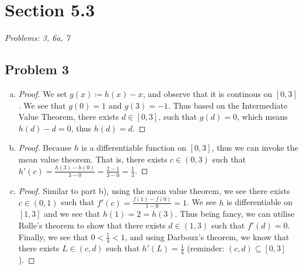 \documentclass[12pt]{article}
\begin{document}

\section*{Section 5.3}
\textit{Problems: 3, 6a, 7}
\subsection*{Problem 3}
\begin{enumerate}[a).]
    \item {
        \begin{proof}
            We set $g(x) \coloneq h(x) - x$, and observe that it is continous on $[0,3]$.
            We see that $g(0) = 1$ and $g(3) = -1$. 
            Thus based on the Intermediate Value Theorem, there exists $d \in [0,3]$, such that $g(d) = 0$, which means $h(d) - d = 0$, thus $h(d) = d$. 
        \end{proof}
    }
    \item {
        \begin{proof}
            Because $h$ is a differentiable function on $[0,3]$, thus we can invoke the mean value theorem. 
            That is, there exists $c \in (0,3)$ such that $h'(c) = \frac{h(3) - h(0)}{3 - 0} = \frac{2 - 1}{3-0} = \frac{1}{3} $. 
        \end{proof}
    }
    \item {
        \begin{proof}
            Similar to part b), using the mean value theorem, we see there exists $c \in (0,1)$ such that $f'(c) = \frac{f(1) - f(0)}{ 1-0} = 1$. 
            We see $h$ is differentiable on $[1,3]$ and we see that $h(1) = 2 = h(3)$.
            Thus being fancy, we can utilise Rolle's theorem to show that there exists $d \in (1,3)$ such that $f'(d) = 0$. 
            Finally, we see that $0<\frac{1}{4} < 1$, and using Darboux's theorem, we know that there exists $L \in (c,d)$ such that $h'(L) = \frac{1}{4}$ (reminder: $(c,d) \subseteq [0,3]$). 
        \end{proof}
    }
\end{enumerate}
\end{document}
